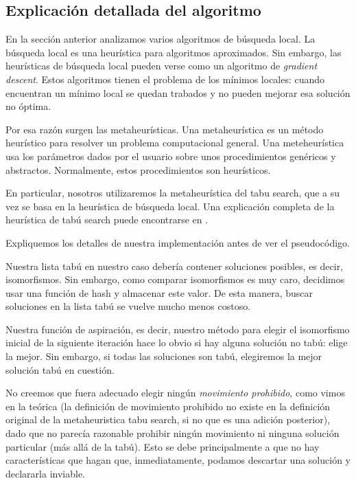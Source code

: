 
\subsection{Explicación detallada del algoritmo}

En la sección anterior analizamos varios algoritmos de búsqueda local.
La búsqueda local es una heurística para algoritmos aproximados.
Sin embargo, las heurísticas de búsqueda local pueden verse como un algoritmo de \emph{gradient descent}.
Estos algoritmos tienen el problema de los mínimos locales: cuando encuentran un mínimo local se quedan trabados y no pueden mejorar esa solución no óptima. 

Por esa razón surgen las metaheurísticas.
Una metaheurística es un método heurístico para resolver un  problema computacional general.
Una meteheurística usa los parámetros dados por el usuario sobre unos procedimientos genéricos y abstractos. 
Normalmente, estos procedimientos son heurísticos.

En particular, nosotros utilizaremos la metaheurística del tabu search, que a su vez se basa en la heurística de búsqueda local.
Una explicación completa de la heurística de tabú search puede encontrarse en \cite{tabusearch}.

Expliquemos los detalles de nuestra implementación antes de ver el pseudocódigo.

Nuestra lista tabú en nuestro caso debería contener soluciones posibles, es decir, isomorfismos. Sin embargo, como comparar isomorfismos es muy caro, decidimos usar una función de hash y almacenar este valor. De esta manera, buscar soluciones en la lista tabú se vuelve mucho menos costoso.

Nuestra función de aspiración, es decir, nuestro método para elegir el isomorfismo inicial de la siguiente iteración hace lo obvio si hay alguna solución no tabú: elige la mejor.
Sin embargo, si todas las soluciones son tabú, elegiremos la mejor solución tabú en cuestión.

No creemos que fuera adecuado elegir ningún \emph{movimiento prohibido}, como vimos en la teórica (la definición de movimiento prohibido no existe en la definición original de la metaheuristica tabu search, si no que es una adición posterior), dado que no parecía razonable prohibir ningún movimiento ni ninguna solución particular (más allá de la tabú).
Esto se debe principalmente a que no hay características que hagan que, inmediatamente, podamos descartar una solución y declararla inviable.

